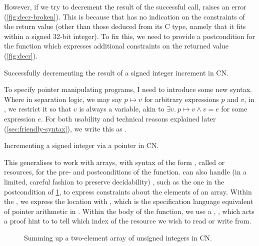 However, if we try to decrement the result of the successful call, 
raises an error (\cref{fig:decr-broken}). This is because that  has no
indication on the constraints of the return value (other than those deduced
from its C type, namely that it fits within a signed 32-bit integer). To fix
this, we need to provide a postcondition for the function which
expresses additional constraints on the returned value (\cref{fig:decr}).

\begin{marginfigure}
    \centering
    \caption{Successfully decrementing the result of a signed integer increment
        in CN.}\label{fig:decr}
\end{marginfigure}

To specify pointer manipulating programs, I need to introduce some new syntax.
Where in separation logic, we may say $p \mapsto v$ for arbitrary expressions
$p$ and $v$, in , we restrict it so that $v$ is always a variable, akin
to $\exists{} v.\ p \mapsto v \wedge v = e$ for some expression $e$. For both
usability and technical reasons explained later (\cref{sec:friendly-syntax}), we
write this as . %

\begin{marginfigure}
    \centering
    \caption{Incrementing a signed integer via a pointer in CN.}\label{fig:owned-incr}
\end{marginfigure}

This generalises to work with arrays, with syntax of the form
, %
called  or  resources, for the pre- and
postconditions of the function.  can also handle (in a limited, careful
fashion to preserve decidability) , such as the
one in the postcondition of \cref{fig:owned-array}, to express constraints
about the elements of an array. Within the , we express the
location with , which is the specification language %
equivalent of pointer arithmetic in . Within the body of the
function, we use a , ,
which acts a proof hint to  to tell which index of the 
resource we wish to read or write from.

\begin{figure}[tp]
    \centering
    \begin{minipage}{1.5\textwidth}
    \end{minipage}
    \caption{Summing up a two-element array of unsigned integers in
        CN.}\label{fig:owned-array}
\end{figure}

